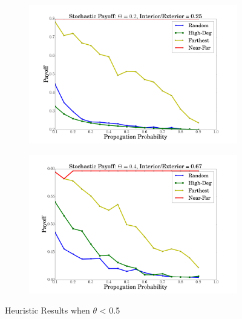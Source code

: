 \documentclass{article}
\begin{document}
 \begin{figure}
  \begin{subfigure}{\linewidth}
  \includegraphics[width=1\textwidth]{../plots/actual/theta=2.png}
  \end{subfigure}\par\medskip
  \begin{subfigure}{\linewidth}
\includegraphics[width=1\textwidth]{../plots/actual/theta=4.png}
  \end{subfigure}\par\medskip
    \caption{Heuristic Results when $\theta$ < 0.5}
\end{figure}
  
\end{document}
